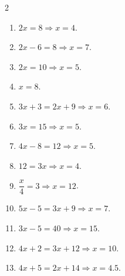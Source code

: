 \documentclass[11pt]{article}
\begin{document}
\begin{keybox}
\begin{multicols}{2}
\small
\begin{enumerate}[leftmargin=*,itemsep=3pt]
  \item $2x=8\Rightarrow x=4$.
  \item $2x-6=8\Rightarrow x=7$.
  \item $2x=10\Rightarrow x=5$.
  \item $x=8$.
  \item $3x+3=2x+9\Rightarrow x=6$.
  \item $3x=15\Rightarrow x=5$.
  \item $4x-8=12\Rightarrow x=5$.
  \item $12=3x\Rightarrow x=4$.
  \item $\dfrac{x}{4}=3\Rightarrow x=12$.
  \item $5x-5=3x+9\Rightarrow x=7$.
  \item $3x-5=40\Rightarrow x=15$.
  \item $4x+2=3x+12\Rightarrow x=10$.
  \item $4x+5=2x+14\Rightarrow x=4.5$.
\end{enumerate}
\end{multicols}
\end{keybox}
\end{document}
